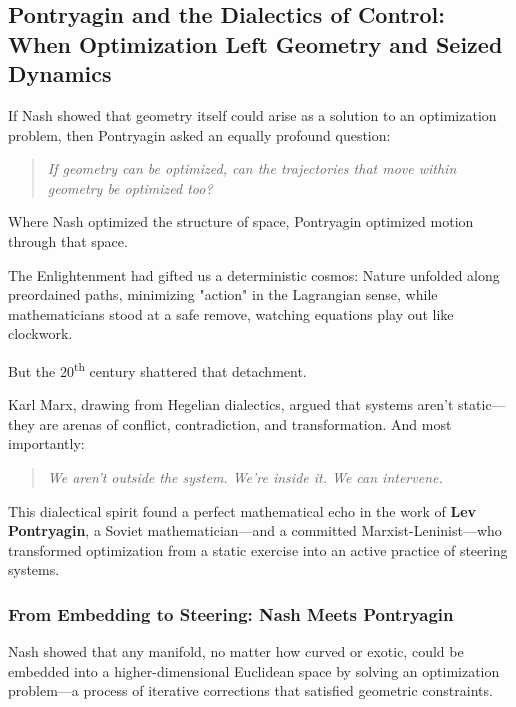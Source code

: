 \subsection{Pontryagin and the Dialectics of Control:  
When Optimization Left Geometry and Seized Dynamics}

If Nash showed that geometry itself could arise as a solution to an optimization problem,  
then Pontryagin asked an equally profound question:

\begin{quote}
\textit{If geometry can be optimized,  
can the trajectories that move within geometry be optimized too?}
\end{quote}

Where Nash optimized the structure of space,  
Pontryagin optimized motion through that space.

\medskip

The Enlightenment had gifted us a deterministic cosmos:  
Nature unfolded along preordained paths, minimizing "action" in the Lagrangian sense, while mathematicians stood at a safe remove, watching equations play out like clockwork.

But the 20\textsuperscript{th} century shattered that detachment.

\medskip

Karl Marx, drawing from Hegelian dialectics, argued that systems aren’t static—they are arenas of conflict, contradiction, and transformation. And most importantly:

\begin{quote}
\textit{We aren’t outside the system. We’re inside it. We can intervene.}
\end{quote}

This dialectical spirit found a perfect mathematical echo in the work of  
\textbf{Lev Pontryagin}, a Soviet mathematician—and a committed Marxist-Leninist—who transformed optimization from a static exercise into an active practice of steering systems.

\subsubsection*{From Embedding to Steering: Nash Meets Pontryagin}

Nash showed that any manifold, no matter how curved or exotic, could be embedded into a higher-dimensional Euclidean space by solving an optimization problem—a process of iterative corrections that satisfied geometric constraints.

